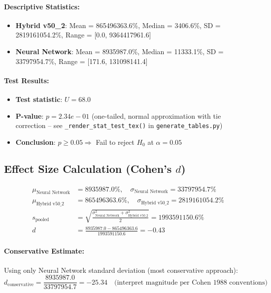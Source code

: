 \documentclass[twoside,11pt]{article}
\begin{document}
\paragraph{Descriptive Statistics:}
\begin{itemize}
\item \textbf{Hybrid v50\_2}: Mean = 865496363.6\%, Median = 3406.6\%, SD = 2819161054.2\%, Range = [0.0, 9364417961.6]
\item \textbf{Neural Network}: Mean = 8935987.0\%, Median = 11333.1\%, SD = 33797954.7\%, Range = [171.6, 131098141.4]
\end{itemize}

\paragraph{Test Results:}
\begin{itemize}
\item \textbf{Test statistic}: $U = 68.0$
\item \textbf{P-value}: $p = 2.34e-01$ (one-tailed, normal approximation with tie correction -- see \texttt{\_render\_stat\_test\_tex()} in \texttt{generate\_tables.py})
\item \textbf{Conclusion}: $p \geq 0.05 \Rightarrow$ Fail to reject $H_0$ at $\alpha = 0.05$
\end{itemize}

\subsection{Effect Size Calculation (Cohen's $d$)}

\begin{align}
\mu_{\text{Neural Network}} &= 8935987.0\%, \quad \sigma_{\text{Neural Network}} = 33797954.7\% \\
\mu_{\text{Hybrid v50\_2}} &= 865496363.6\%, \quad \sigma_{\text{Hybrid v50\_2}} = 2819161054.2\% \\
s_{\text{pooled}} &= \sqrt{\frac{\sigma_{\text{Neural Network}}^2 + \sigma_{\text{Hybrid v50\_2}}^2}{2}} = 1993591150.6\% \\
d &= \frac{8935987.0 - 865496363.6}{1993591150.6} = -0.43
\end{align}

\paragraph{Conservative Estimate:}
Using only Neural Network standard deviation (most conservative approach):
\begin{equation}
d_{\text{conservative}} = \frac{8935987.0}{33797954.7} = -25.34 \quad \text{(interpret magnitude per Cohen 1988 conventions)}
\end{equation}
\end{document}
